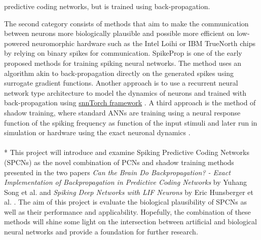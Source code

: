 \documentclass[a4paper,11pt]{article}
\begin{document}
predictive coding networks, but is trained using back-propagation. 

The second category consists of methods that aim to make the communication between neurons more biologically plausible and possible more efficient on low-powered neuromorphic hardware such as the Intel Loihi or IBM TrueNorth chips by relying on binary spikes for communication. SpikeProp \cite{Boht2000SpikePropBF} is one of the early proposed methods for training spiking neural networks. The method uses an algorithm akin to back-propagation directly on the generated spikes using surrogate gradient functions. Another approach is to use a recurrent neural network type architecture to model the dynamics of neurons and trained with back-propagation using \href{https://snntorch.readthedocs.io/en/latest/}{snnTorch framework} \cite{eshraghian2021training}. A third approach is the method of shadow training, where standard ANNs are training using a neural response function of the spiking frequency as function of the input stimuli and later run in simulation or hardware using the exact neuronal dynamics \cite{hunsberger2015spiking}. \\
\\*
This project will introduce and examine Spiking Predictive Coding Networks (SPCNs) as the novel combination of PCNs and shadow training methods presented in the two papers \textit{Can the Brain Do Backpropagation? - Exact Implementation of Backpropagation in Predictive Coding Networks} by Yuhang Song et al. \cite{PredictiveCodingNetworks} and \textit{Spiking Deep Networks with LIF Neurons} by Eric Hunsberger et al. \cite{hunsberger2015spiking}. The aim of this project is evaluate the biological plausibility of SPCNs as well as their performance and
applicability. Hopefully, the combination of these methods will shine some light on the intersection between artificial and biological neural networks and provide a foundation for further research.


\newpage
\end{document}
